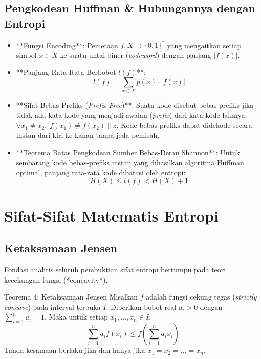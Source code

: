 \documentclass[11pt,a4paper]{article}
\begin{document}
\subsection{Pengkodean Huffman \& Hubungannya dengan Entropi}
\begin{itemize}[leftmargin=*]
    \item **Fungsi Encoding**: Pemetaan $f: X \to \{0,1\}^*$ yang mengaitkan setiap simbol $x \in X$ ke suatu untai biner (\textit{codeword}) dengan panjang $|f(x)|$.
    \item **Panjang Rata-Rata Berbobot $l(f)$**:
    \begin{equation}
    \label{eq:avg_codelength}
    l(f) = \sum_{x \in X} p(x) \cdot |f(x)|
    \end{equation}
    \item **Sifat Bebas-Prefiks (\textit{Prefix-Free})**: Suatu kode disebut bebas-prefiks jika tidak ada kata kode yang menjadi awalan (\textit{prefix}) dari kata kode lainnya: $\forall x_1 \neq x_2, \; f(x_1) \neq f(x_2) \| z$. Kode bebas-prefiks dapat didekode secara instan dari kiri ke kanan tanpa jeda pemisah.
    \item **Teorema Batas Pengkodean Sumber Bebas-Derau Shannon**:
    Untuk sembarang kode bebas-prefiks instan yang dihasilkan algoritma Huffman optimal, panjang rata-rata kode dibatasi oleh entropi:
    \begin{equation}
    \label{eq:huffman_bounds}
    H(X) \le l(f) < H(X) + 1
    \end{equation}
\end{itemize}

\section{Sifat-Sifat Matematis Entropi}

\subsection{Ketaksamaan Jensen}
Fondasi analitis seluruh pembuktian sifat entropi bertumpu pada teori kecekungan fungsi (*concavity*).

\begin{thmbox}{Teorema 4: Ketaksamaan Jensen}
Misalkan $f$ adalah fungsi cekung tegas (\textit{strictly concave}) pada interval terbuka $I$. Diberikan bobot real $a_i > 0$ dengan $\sum_{i=1}^n a_i = 1$. Maka untuk setiap $x_1, \dots, x_n \in I$:
\begin{equation}
\label{eq:jensen}
\sum_{i=1}^n a_i f(x_i) \le f\left(\sum_{i=1}^n a_i x_i\right)
\end{equation}
Tanda kesamaan berlaku jika dan hanya jika $x_1 = x_2 = \dots = x_n$.
\end{thmbox}
\end{document}

